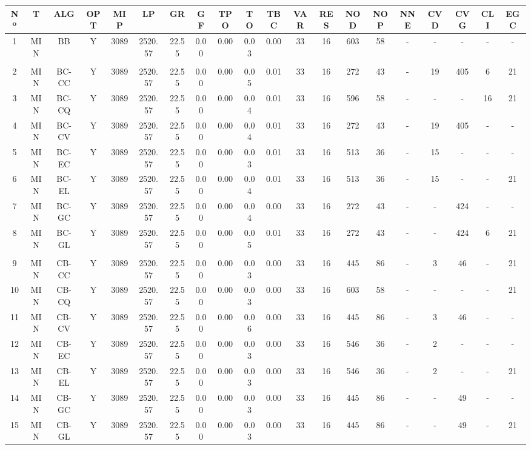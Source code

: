 {
\footnotesize\centering
\hspace*{-5mm}\begin{tabular}{ *{19}{c|} c }
\hline
\textbf{Nº} & \textbf{T} & \textbf{ALG} & \textbf{OPT} & \textbf{MIP} & \textbf{LP} & \textbf{GR} & \textbf{GF} & \textbf{TPO} & \textbf{TO} & \textbf{TBC} & \textbf{VAR} & \textbf{RES} & \textbf{NOD} & \textbf{NOP} & \textbf{NNE} & \textbf{CVD} & \textbf{CVG} & \textbf{CLI} & \textbf{EGC}\\
\hline
1 & MIN & BB & Y & 3089 & 2520.57 & 22.55 & 0.00 & 0.00 & 0.03 & 0.00 & 33 & 16 & 603 & 58 & - & - & - & - & -\\
\hline
\multicolumn{20}{c}{}
\\
\hline
2 & MIN & BC-CC & Y & 3089 & 2520.57 & 22.55 & 0.00 & 0.00 & 0.05 & 0.01 & 33 & 16 & 272 & 43 & - & 19 & 405 & 6 & 21\\
\hline
3 & MIN & BC-CQ & Y & 3089 & 2520.57 & 22.55 & 0.00 & 0.00 & 0.04 & 0.01 & 33 & 16 & 596 & 58 & - & - & - & 16 & 21\\
\hline
4 & MIN & BC-CV & Y & 3089 & 2520.57 & 22.55 & 0.00 & 0.00 & 0.04 & 0.01 & 33 & 16 & 272 & 43 & - & 19 & 405 & - & -\\
\hline
5 & MIN & BC-EC & Y & 3089 & 2520.57 & 22.55 & 0.00 & 0.00 & 0.03 & 0.01 & 33 & 16 & 513 & 36 & - & 15 & - & - & -\\
\hline
6 & MIN & BC-EL & Y & 3089 & 2520.57 & 22.55 & 0.00 & 0.00 & 0.04 & 0.01 & 33 & 16 & 513 & 36 & - & 15 & - & - & 21\\
\hline
7 & MIN & BC-GC & Y & 3089 & 2520.57 & 22.55 & 0.00 & 0.00 & 0.04 & 0.00 & 33 & 16 & 272 & 43 & - & - & 424 & - & -\\
\hline
8 & MIN & BC-GL & Y & 3089 & 2520.57 & 22.55 & 0.00 & 0.00 & 0.05 & 0.01 & 33 & 16 & 272 & 43 & - & - & 424 & 6 & 21\\
\hline
\multicolumn{20}{c}{}
\\
\hline
9 & MIN & CB-CC & Y & 3089 & 2520.57 & 22.55 & 0.00 & 0.00 & 0.03 & 0.00 & 33 & 16 & 445 & 86 & - & 3 & 46 & - & 21\\
\hline
10 & MIN & CB-CQ & Y & 3089 & 2520.57 & 22.55 & 0.00 & 0.00 & 0.03 & 0.00 & 33 & 16 & 603 & 58 & - & - & - & - & 21\\
\hline
11 & MIN & CB-CV & Y & 3089 & 2520.57 & 22.55 & 0.00 & 0.00 & 0.06 & 0.00 & 33 & 16 & 445 & 86 & - & 3 & 46 & - & -\\
\hline
12 & MIN & CB-EC & Y & 3089 & 2520.57 & 22.55 & 0.00 & 0.00 & 0.03 & 0.00 & 33 & 16 & 546 & 36 & - & 2 & - & - & -\\
\hline
13 & MIN & CB-EL & Y & 3089 & 2520.57 & 22.55 & 0.00 & 0.00 & 0.03 & 0.00 & 33 & 16 & 546 & 36 & - & 2 & - & - & 21\\
\hline
14 & MIN & CB-GC & Y & 3089 & 2520.57 & 22.55 & 0.00 & 0.00 & 0.03 & 0.00 & 33 & 16 & 445 & 86 & - & - & 49 & - & -\\
\hline
15 & MIN & CB-GL & Y & 3089 & 2520.57 & 22.55 & 0.00 & 0.00 & 0.03 & 0.00 & 33 & 16 & 445 & 86 & - & - & 49 & - & 21\\
\hline
\end{tabular}\\
\vspace{4mm}
}

